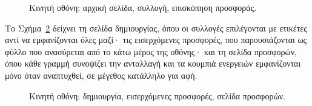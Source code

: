 \begin{figure}[H]
\centering
{}
\caption{Κινητή οθόνη: αρχική σελίδα, συλλογή, επισκόπηση προσφοράς.}
\label{fig:demo-mobile-1}
\end{figure}

Το Σχήμα~\ref{fig:demo-mobile-2} δείχνει τη σελίδα δημιουργίας, όπου οι συλλογές
επιλέγονται με ετικέτες αντί να εμφανίζονται όλες μαζί· τις εισερχόμενες προσφορές, που
παρουσιάζονται ως φύλλο που ανασύρεται από το κάτω μέρος της οθόνης· και τη σελίδα
προσφορών, όπου κάθε γραμμή συνοψίζει την ανταλλαγή και τα κουμπιά ενεργειών εμφανίζονται
μόνο όταν αναπτυχθεί, σε μέγεθος κατάλληλο για αφή.

\begin{figure}[H]
\centering
{}
\caption{Κινητή οθόνη: δημιουργία, εισερχόμενες προσφορές, σελίδα προσφορών.}
\label{fig:demo-mobile-2}
\end{figure}

